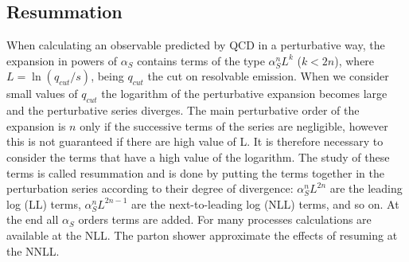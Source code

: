 \subsection*{Resummation} When calculating an observable predicted by QCD in a perturbative way, the expansion in powers of $ \alpha_S $ contains terms of the type $ \alpha_S^n L^k $ ($ k < 2n $), where $ L = \ln (q_{cut} / s) $, being $ q_{cut} $ the cut on resolvable emission. 
When we consider small values of  $q_{cut}$ the logarithm of the perturbative expansion becomes large and the  perturbative series diverges.
The main  perturbative order of the expansion is $n$  only if the successive terms of the series are negligible, however this is not guaranteed if there are high value of L. 
It is therefore necessary to consider the terms that have a high value of the logarithm. The study of these terms is called resummation and is done by putting the terms together in the perturbation series according to their degree of divergence:
$ \alpha_S ^ n L ^ {2n} $ are the leading log (LL) terms, $ \alpha_S ^ n L ^ {2n-1} $ are the next-to-leading log (NLL) terms, and so on. 
At the end  all $ \alpha_S $ orders terms are added. For many processes calculations are available at the NLL.
The parton shower approximate the effects of resuming at the NNLL. 


